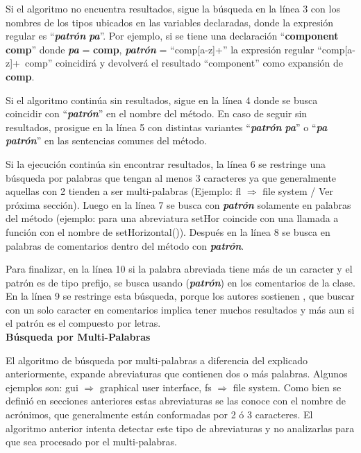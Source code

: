 Si el algoritmo no encuentra resultados, sigue la búsqueda en la línea 3 con los nombres de los tipos ubicados en las variables declaradas, donde la expresión regular es “\textit{\textbf{patrón}} \textit{\textbf{pa}}”. Por ejemplo, si se tiene una declaración “\textbf{component comp}” donde \textit{\textbf{pa}} = \textbf{comp}, \textit{\textbf{patrón}} = “comp[a-z]+”  la expresión regular \mbox{“comp[a-z]+ comp”} coincidirá y devolverá el resultado  “component” como expansión de \textbf{comp}.

Si el algoritmo continúa sin resultados, sigue en la línea 4 donde se busca coincidir con “\textit{\textbf{patrón}}” en el nombre del método. En caso de seguir sin resultados, prosigue en la línea 5 con distintas variantes “\textit{\textbf{patrón}} \textit{\textbf{pa}}” o “\textit{\textbf{pa}} \textit{\textbf{patrón}}” en las sentencias comunes del método. 


Si la ejecución continúa sin encontrar resultados, la línea 6 se restringe una búsqueda por palabras que tengan al menos 3 caracteres ya que generalmente aquellas con 2 tienden a ser multi-palabras (Ejemplo: \textsf{fl $\Rightarrow$ file system} / Ver próxima sección). Luego en la línea 7 se busca con \textit{\textbf{patrón}} solamente en palabras del método (ejemplo: para una abreviatura \textsf{setHor} coincide con una llamada a función con el nombre de \textsf{setHorizontal()}). Después en la línea 8 se busca en palabras de comentarios dentro del método con \textit{\textbf{patrón}}.

Para finalizar, en la línea 10 si la palabra abreviada tiene más de un caracter y el patrón es de tipo prefijo, se busca usando (\textit{\textbf{patrón}}) en los comentarios de la clase. En la línea 9 se restringe esta búsqueda, porque los autores sostienen \cite{EZH08}, que buscar con un solo caracter en comentarios implica tener muchos resultados y más aun si el patrón es el compuesto por letras.\\

\noindent \textbf{Búsqueda por Multi-Palabras\\}

El algoritmo de búsqueda por multi-palabras a diferencia del explicado anteriormente, expande abreviaturas que contienen dos o más palabras. Algunos ejemplos son: \textsf{gui $\Rightarrow$ graphical user interface, fs $\Rightarrow$ file system}. Como bien se definió en secciones anteriores estas abreviaturas se las conoce con el nombre de acrónimos, que generalmente están conformadas por 2 ó 3 caracteres. El algoritmo anterior intenta detectar este tipo de abreviaturas y no analizarlas para que sea procesado por el multi-palabras.

